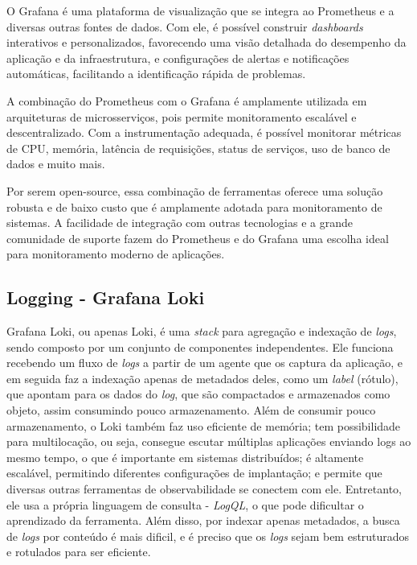 O Grafana é uma plataforma de visualização que se integra ao Prometheus e a diversas outras fontes de dados. Com ele, é possível construir \emph{dashboards} interativos e personalizados, favorecendo uma visão detalhada do desempenho da aplicação e da infraestrutura, e configurações de alertas e notificações automáticas, facilitando a identificação rápida de problemas.

A combinação do Prometheus com o Grafana é amplamente utilizada em arquiteturas de microsserviços, pois permite monitoramento escalável e descentralizado. Com a instrumentação adequada, é possível monitorar métricas de CPU, memória, latência de requisições, status de serviços, uso de banco de dados e muito mais.

Por serem open-source, essa combinação de ferramentas oferece uma solução robusta e de baixo custo que é amplamente adotada para monitoramento de sistemas. A facilidade de integração com outras tecnologias e a grande comunidade de suporte fazem do Prometheus e do Grafana uma escolha ideal para monitoramento moderno de aplicações.

\subsection{Logging - Grafana Loki}
Grafana Loki, ou apenas Loki, é uma \emph{stack} para agregação e indexação de \emph{logs}, sendo composto por um conjunto de componentes independentes. Ele funciona recebendo um fluxo de \emph{logs} a partir de um agente que os captura da aplicação, e em seguida faz a indexação apenas de metadados deles, como um \emph{label} (rótulo), que apontam para os dados do \emph{log}, que são compactados e armazenados como objeto, assim consumindo pouco armazenamento. Além de consumir pouco armazenamento, o Loki também faz uso eficiente de memória; tem possibilidade para multilocação, ou seja, consegue escutar múltiplas aplicações enviando logs ao mesmo tempo, o que é importante em sistemas distribuídos; é altamente escalável, permitindo diferentes configurações de implantação; e permite que diversas outras ferramentas de observabilidade se conectem com ele. Entretanto, ele usa a própria linguagem de consulta - \emph{LogQL}, o que pode dificultar o aprendizado da ferramenta. Além disso, por indexar apenas metadados, a busca de \emph{logs} por conteúdo é mais dificil, e é preciso que os \emph{logs} sejam bem estruturados e rotulados para ser eficiente. \cite{grafana-loki}

